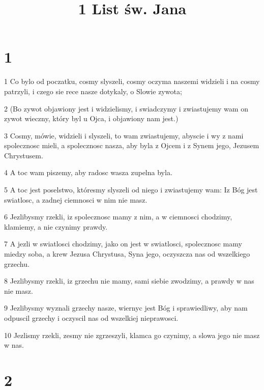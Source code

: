 

\title{1 List św. Jana}


\chapter{1}

\par 1 Co bylo od poczatku, cosmy slyszeli, cosmy oczyma naszemi widzieli i na cosmy patrzyli, i czego sie rece nasze dotykaly, o Slowie zywota;
\par 2 (Bo zywot objawiony jest i widzielismy, i swiadczymy i zwiastujemy wam on zywot wieczny, który byl u Ojca, i objawiony nam jest.)
\par 3 Cosmy, mówie, widzieli i slyszeli, to wam zwiastujemy, abyscie i wy z nami spolecznosc mieli, a spolecznosc nasza, aby byla z Ojcem i z Synem jego, Jezusem Chrystusem.
\par 4 A toc wam piszemy, aby radosc wasza zupelna byla.
\par 5 A toc jest poselstwo, któresmy slyszeli od niego i zwiastujemy wam: Iz Bóg jest swiatlosc, a zadnej ciemnosci w nim nie masz.
\par 6 Jezlibysmy rzekli, iz spolecznosc mamy z nim, a w ciemnosci chodzimy, klamiemy, a nie czynimy prawdy.
\par 7 A jezli w swiatlosci chodzimy, jako on jest w swiatlosci, spolecznosc mamy miedzy soba, a krew Jezusa Chrystusa, Syna jego, oczyszcza nas od wszelkiego grzechu.
\par 8 Jezlibysmy rzekli, iz grzechu nie mamy, sami siebie zwodzimy, a prawdy w nas nie masz.
\par 9 Jezlibysmy wyznali grzechy nasze, wiernyc jest Bóg i sprawiedliwy, aby nam odpuscil grzechy i oczyscil nas od wszelkiej nieprawosci.
\par 10 Jezlismy rzekli, zesmy nie zgrzeszyli, klamca go czynimy, a slowa jego nie masz w nas.

\chapter{2}

